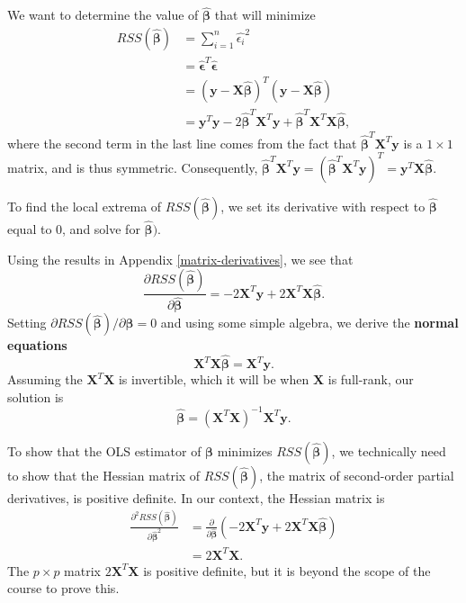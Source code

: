\documentclass[
]{book}
\theoremstyle{definition}
\theoremstyle{definition}
\theoremstyle{definition}
\theoremstyle{definition}
\theoremstyle{remark}
\begin{document}
We want to determine the value of \(\hat{\boldsymbol{\beta}}\) that will minimize
\[
\begin{aligned}
RSS(\hat{\boldsymbol{\beta}}) &=\sum_{i=1}^n \hat{\epsilon_i}^2 \\
&= \hat{\boldsymbol{\epsilon}}^T\hat{\boldsymbol{\epsilon}} \\
&= (\mathbf{y} - \mathbf{X}\hat{\boldsymbol{\beta}})^T(\mathbf{y} - \mathbf{X}\hat{\boldsymbol{\beta}}) \\
&= \mathbf{y}^T\mathbf{y}-2\hat{\boldsymbol{\beta}}^T\mathbf{X}^T\mathbf{y}+\hat{\boldsymbol{\beta}}^T\mathbf{X}^T\mathbf{X}\hat{\boldsymbol{\beta}},
\end{aligned}
\]
where the second term in the last line comes from the fact that \(\hat{\boldsymbol{\beta}}^T\mathbf{X}^T\mathbf{y}\) is a \(1\times 1\) matrix, and is thus symmetric. Consequently, \(\hat{\boldsymbol{\beta}}^T\mathbf{X}^T\mathbf{y}=(\hat{\boldsymbol{\beta}}^T\mathbf{X}^T\mathbf{y})^T=\mathbf{y}^T\mathbf{X}\hat{\boldsymbol{\beta}}\).

To find the local extrema of \(RSS(\hat{\boldsymbol{\beta}})\), we set its derivative with respect to \(\hat{\boldsymbol{\beta}}\) equal to 0, and solve for \(\hat{\boldsymbol{\beta}})\).

Using the results in Appendix \ref{matrix-derivatives},
we see that
\[
\frac{\partial RSS(\hat{\boldsymbol{\beta}})}{\partial\hat{\boldsymbol{\beta}}} = -2\mathbf{X}^T\mathbf{y} + 2\mathbf{X}^T\mathbf{X}\hat{\boldsymbol{\beta}}.
\]
Setting \(\partial RSS(\hat{\boldsymbol{\beta}})/\partial\hat{\boldsymbol{\beta}}=0\) and using some simple algebra, we derive the \textbf{normal equations}
\[\mathbf{X}^T\mathbf{X}\hat{\boldsymbol{\beta}}=\mathbf{X}^T\mathbf{y}.\]
Assuming the \(\mathbf{X}^T\mathbf{X}\) is invertible, which it will be when \(\mathbf{X}\) is full-rank, our solution is
\[\hat{\boldsymbol{\beta}}=(\mathbf{X}^T\mathbf{X})^{-1}\mathbf{X}^T\mathbf{y}.\]

To show that the OLS estimator of \(\boldsymbol{\beta}\) minimizes \(RSS(\hat{\boldsymbol{\beta}})\), we technically need to show that the Hessian matrix of \(RSS(\hat{\boldsymbol{\beta}})\), the matrix of second-order partial derivatives, is positive definite. In our context, the Hessian matrix is
\[
\begin{aligned}
\frac{\partial^2 RSS(\hat{\boldsymbol{\beta}})}{\partial \hat{\boldsymbol{\beta}}^2} &= \frac{\partial}{\partial \hat{\boldsymbol{\beta}}}(-2\mathbf{X}^T\mathbf{y} + 2\mathbf{X}^T\mathbf{X}\hat{\boldsymbol{\beta}}) \\
&= 2\mathbf{X}^T\mathbf{X}.
\end{aligned}
\]
The \(p\times p\) matrix \(2\mathbf{X}^T\mathbf{X}\) is positive definite, but it is beyond the scope of the course to prove this.
\end{document}
